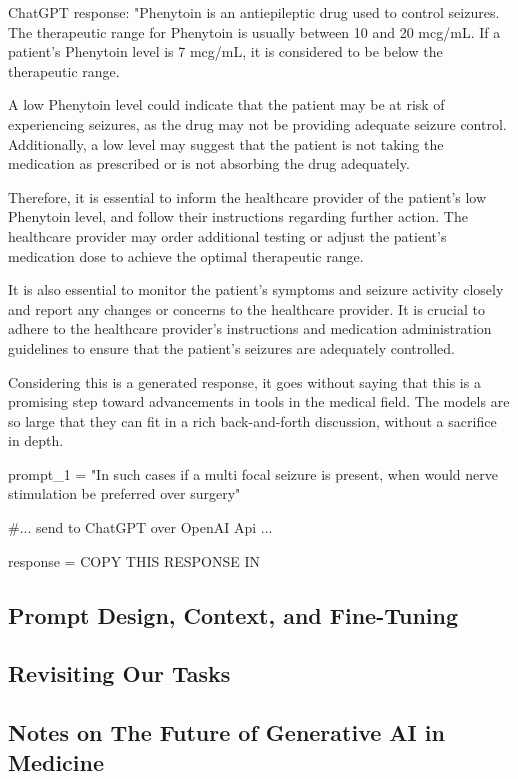 \begin{displayquote}
  ChatGPT response: "Phenytoin is an antiepileptic drug used to control seizures. The therapeutic range for Phenytoin is usually between 10 and 20 mcg/mL. If a patient's Phenytoin level is 7 mcg/mL, it is considered to be below the therapeutic range.

  A low Phenytoin level could indicate that the patient may be at risk of experiencing seizures, as the drug may not be providing adequate seizure control. Additionally, a low level may suggest that the patient is not taking the medication as prescribed or is not absorbing the drug adequately.
  
  Therefore, it is essential to inform the healthcare provider of the patient's low Phenytoin level, and follow their instructions regarding further action. The healthcare provider may order additional testing or adjust the patient's medication dose to achieve the optimal therapeutic range.
  
  It is also essential to monitor the patient's symptoms and seizure activity closely and report any changes or concerns to the healthcare provider. It is crucial to adhere to the healthcare provider's instructions and medication administration guidelines to ensure that the patient's seizures are adequately controlled.
\end{displayquote}

Considering this is a generated response, it goes without saying that this is a promising step toward advancements in tools
in the medical field. The models are so large that they can fit in a rich back-and-forth discussion, without a sacrifice
in depth.

\begin{python}
    prompt_1 = "In such cases if a multi focal seizure is present, when would nerve stimulation be preferred over surgery"
  
    #... send to ChatGPT over OpenAI Api ...
  
    response = COPY THIS RESPONSE IN
  \end{python}

\subsection{Prompt Design, Context, and Fine-Tuning}

\subsection{Revisiting Our Tasks}

\subsection{Notes on The Future of Generative AI in Medicine}
